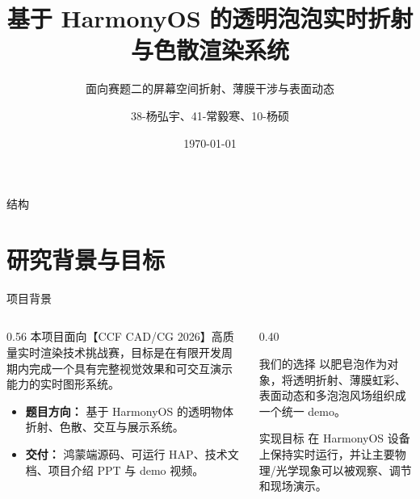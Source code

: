 \documentclass[11pt,aspectratio=169]{beamer}
\title[鸿蒙透明泡泡渲染]{基于 HarmonyOS 的透明泡泡实时折射与色散渲染系统}
\subtitle{面向赛题二的屏幕空间折射、薄膜干涉与表面动态}
\author[USTCCG26 第3组]{38-杨弘宇、41-常毅寒、10-杨硕}
\institute[USTC]{University of Science and Technology of China}
\date{\today}
\begin{document}
\begin{frame}
  \titlepage
\end{frame}

\begin{frame}{结构}
  \tableofcontents
\end{frame}

\section{研究背景与目标}

\begin{frame}{项目背景}
  \begin{columns}[T]
    \begin{column}{0.56\linewidth}
      本项目面向【CCF CAD/CG 2026】高质量实时渲染技术挑战赛，目标是在有限开发周期内完成一个具有完整视觉效果和可交互演示能力的实时图形系统。
      \vspace{0.6em}
      \begin{itemize}
        \item \textbf{题目方向：} 基于 HarmonyOS 的透明物体折射、色散、交互与展示系统。
        \item \textbf{交付：} 鸿蒙端源码、可运行 HAP、技术文档、项目介绍 PPT 与 demo 视频。
      \end{itemize}
    \end{column}
    \begin{column}{0.40\linewidth}
      \begin{block}{我们的选择}
        以肥皂泡作为对象，将透明折射、薄膜虹彩、表面动态和多泡泡风场组织成一个统一 demo。
      \end{block}
      \begin{block}{实现目标}
        在 HarmonyOS 设备上保持实时运行，并让主要物理/光学现象可以被观察、调节和现场演示。
      \end{block}
    \end{column}
  \end{columns}
\end{frame}
\end{document}
